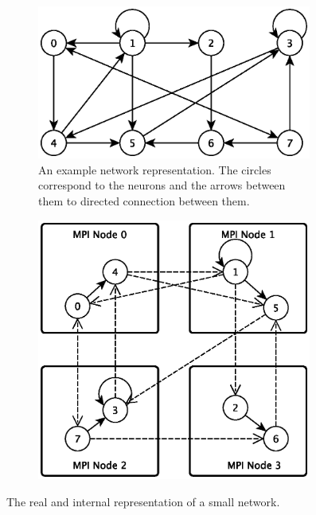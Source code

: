 \documentclass[12pt]{article}
\begin{document}
\begin{figure}[tbp]
	\begin{subfigure}[b]{0.48\linewidth}
		\includegraphics[width=0.99\textwidth]{realNetwork.eps}
        \caption{An example network representation. The circles correspond to the neurons and the arrows between them to directed connection between them.}
		\label{fig-realNetwork}
	\end{subfigure} 
	\quad
	\begin{subfigure}[b]{0.48\linewidth}
		\includegraphics[width=0.99\textwidth]{internalNetwork.eps}
		\label{fig-internalNetwork}
	\end{subfigure}
    \caption{The real and internal representation of a small network.}
\end{figure}
\end{document}
